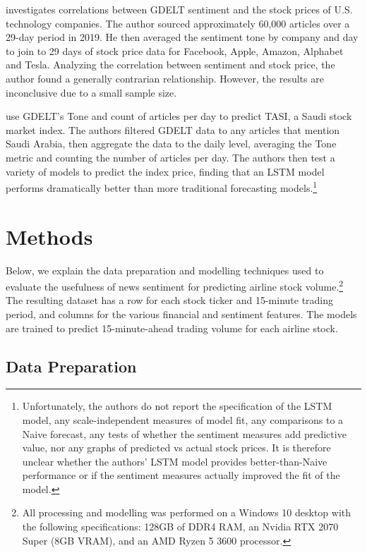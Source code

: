 \documentclass[12pt]{article}
\begin{document}
\textcite{jakel2019using} investigates correlations between GDELT sentiment and the stock prices of U.S. technology companies. The author sourced approximately 60,000 articles over a 29-day period in 2019. He then averaged the sentiment tone by company and day to join to 29 days of stock price data for Facebook, Apple, Amazon, Alphabet and Tesla. Analyzing the correlation between sentiment and stock price, the author found a generally contrarian relationship. However, the results are inconclusive due to a small sample size.

\textcite{alamro2019predicting} use GDELT's Tone and count of articles per day to predict TASI, a Saudi stock market index. The authors filtered GDELT data to any articles that mention Saudi Arabia, then aggregate the data to the daily level, averaging the Tone metric and counting the number of articles per day. The authors then test a variety of models to predict the index price, finding that an LSTM model performs dramatically better than more traditional forecasting models.\footnote{Unfortunately, the authors do not report the specification of the LSTM model, any scale-independent measures of model fit, any comparisons to a Naive forecast, any tests of whether the sentiment measures add predictive value, nor any graphs of predicted vs actual stock prices. It is therefore unclear whether the authors' LSTM model provides better-than-Naive performance or if the sentiment measures actually improved the fit of the model.}

\section{Methods}
\label{section:methods}

Below, we explain the data preparation and modelling techniques used to evaluate the usefulness of news sentiment for predicting airline stock volume.\footnote{All processing and modelling was performed on a Windows 10 desktop with the following specifications: 128GB of DDR4 RAM, an Nvidia RTX 2070 Super (8GB VRAM), and an AMD Ryzen 5 3600 processor.} The resulting dataset has a row for each stock ticker and 15-minute trading period, and columns for the various financial and sentiment features. The models are trained to predict 15-minute-ahead trading volume for each airline stock.

\subsection{Data Preparation}
\end{document}
